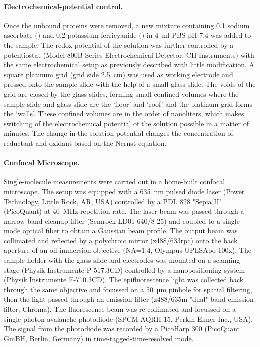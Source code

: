 \documentclass[journal=jacsat,manuscript=article]{achemso}
\begin{document}
\paragraph*{Electrochemical-potential control.}
Once the unbound proteins were removed, a new mixture containing \SI{0.1}{\mM} sodium ascorbate () and \SI{0.2}{\mM} potassium ferricyanide (\ce{[Fe(CN)6^3-]}) in \SI{4}{\ml} PBS pH 7.4 was added to the sample.
The redox potential of the solution was further controlled by a potentiostat (Model 800B Series Electrochemical Detector, CH Instruments) with the same electrochemical setup as previously described\cite{zhang2017gold} with little modification.
A square platinum grid (grid side \SI{2.5}{\cm}) was used as working electrode and pressed onto the sample slide with the help of a small glass slide.
The voids of the grid are closed by the glass slides, forming small confined volumes where the sample slide and glass slide are the `floor' and `roof' and the platinum grid forms the `walls'.
These confined volumes are in the order of nanoliters, which makes switching of the electrochemical potential of the solution possible in a matter of minutes.
The change in the solution potential changes the concentration of reductant and oxidant based on the Nernst equation.

\paragraph*{Confocal Microscope.}
Single-molecule measurements were carried out in a home-built confocal microscope.
The setup was equipped with a \SI{635}{\nm} pulsed diode laser (Power Technology, Little Rock, AR, USA) controlled by a PDL 828 "Sepia II" (PicoQuant) at \SI{40}{\MHz} repetition rate.
The laser beam was passed through a narrow-band cleanup filter (Semrock LD01-640/8-25) and coupled to a single-mode optical fiber to obtain a Gaussian beam profile.
The output beam was collimated and reflected by a polychroic mirror (z488/633rpc) onto the back aperture of an oil immersion objective (NA=1.4, Olympus UPLSApo 100x).
The sample holder with the glass slide and electrodes was mounted on a scanning stage (Physik Instrumente P-517.3CD) controlled by a nanopositioning system (Physik Instrumente E-710.3CD). 
The epifluorescence light was collected back through the same objective and focussed on a \SI{50}{\um} pinhole for spatial filtering, then the light passed through an emission filter (z488/635m "dual"-band emission filter, Chroma). 
The fluorescence beam was re-collimated and focussed on a single-photon avalanche photodiode (SPCM AQRH-15, Perkin Elmer Inc., USA).
The signal from the photodiode was recorded by a PicoHarp 300 (PicoQuant GmBH, Berlin, Germany) in time-tagged-time-resolved mode.
\end{document}
